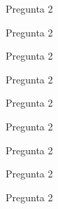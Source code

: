 \documentclass[aspectratio=169]{beamer}
\begin{document}
\begin{frame}
\begin{block}{Pregunta 2}

\end{block}
\end{frame}



\begin{frame}
\begin{block}{Pregunta 2}

\end{block}
\end{frame}



\begin{frame}
\begin{block}{Pregunta 2}

\end{block}
\end{frame}



\begin{frame}
\begin{block}{Pregunta 2}

\end{block}
\end{frame}




\begin{frame}
\begin{block}{Pregunta 2}

\end{block}
\end{frame}



\begin{frame}
\begin{block}{Pregunta 2}

\end{block}
\end{frame}\begin{frame}
\begin{block}{Pregunta 2}

\end{block}
\end{frame}



\begin{frame}
\begin{block}{Pregunta 2}

\end{block}
\end{frame}\begin{frame}
\begin{block}{Pregunta 2}

\end{block}
\end{frame}
\end{document}
